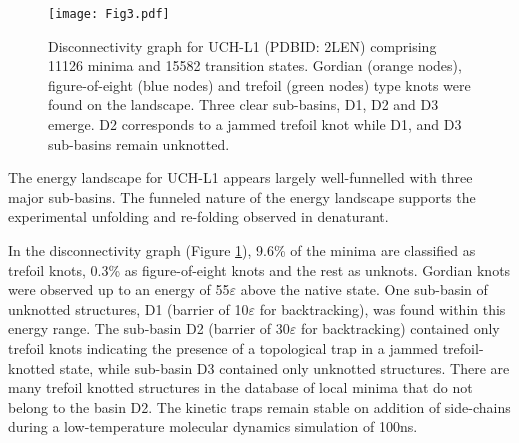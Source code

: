 \documentclass[journal=jacsat]{achemso}
\begin{document}
\begin{figure}
    \centering
    \texttt{[image: Fig3.pdf]}
    \caption{Disconnectivity graph for UCH-L1 (PDBID: 2LEN) comprising 11126 minima and 15582 transition states. Gordian (orange nodes), figure-of-eight (blue nodes) and trefoil (green nodes) type knots were found on the landscape. Three clear sub-basins, D1, D2 and D3 emerge. D2 corresponds to a jammed trefoil knot while D1, and D3 sub-basins remain unknotted.\label{fig:fig2}}
\end{figure}


The energy landscape for UCH-L1 appears largely well-funnelled with three major sub-basins. The funneled nature of the energy landscape supports the experimental unfolding and re-folding observed in denaturant.  

In the disconnectivity graph (Figure \ref{fig:fig2}), 9.6\% of the minima are classified as trefoil knots, 0.3\%  as figure-of-eight knots and the rest as unknots. Gordian knots were observed up to an energy of 55$\varepsilon$ above the native state. One sub-basin of unknotted structures, D1 (barrier of 10$\varepsilon$ for backtracking), was found within this energy range. The sub-basin D2 (barrier of 30$\varepsilon$ for backtracking) contained only trefoil knots indicating the presence of a topological trap in a jammed trefoil-knotted state, while sub-basin D3 contained only unknotted structures. There are many trefoil knotted structures in the database of local minima that do not belong to the basin D2. The kinetic traps remain stable on addition of side-chains\cite{} during a low-temperature molecular dynamics simulation of 100ns.  
\end{document}
